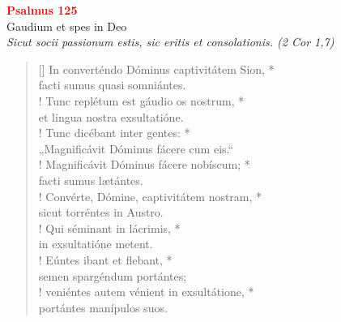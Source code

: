 


\def\greinitialformat#1{%
{\fontsize{39}{39}\selectfont #1}%
}




\vspace{0.3cm}
\begin{center}
 \textcolor{red}{\large \bf Psalmus 125}\\
Gaudium et spes in Deo\\
\textit{\small Sicut socii passionum estis, sic eritis et consolationis. (2 Cor 1,7)}
\end{center}
\begin{verse}[\versewidth]
In converténdo Dóminus captivitátem Sion, *\\
facti sumus quasi somniántes.\\!
\vin Tunc replétum est gáudio os nostrum, *\\
\vin et lingua nostra exsultatióne.\\!
Tunc dicébant inter gentes: *\\
„Magnificávit Dóminus fácere cum eis.“\\!
\vin Magnificávit Dóminus fácere nobíscum; *\\
\vin facti sumus lætántes.\\!
Convérte, Dómine, captivitátem nostram, *\\
sicut torréntes in Austro.\\!
\vin Qui séminant in lácrimis, *\\
\vin in exsultatióne metent.\\!
Eúntes ibant et flebant, *\\
semen spargéndum portántes;\\!
\vin veniéntes autem vénient in exsultátione, *\\
\vin portántes manípulos suos.\\
\end{verse}
\vspace{1cm}


